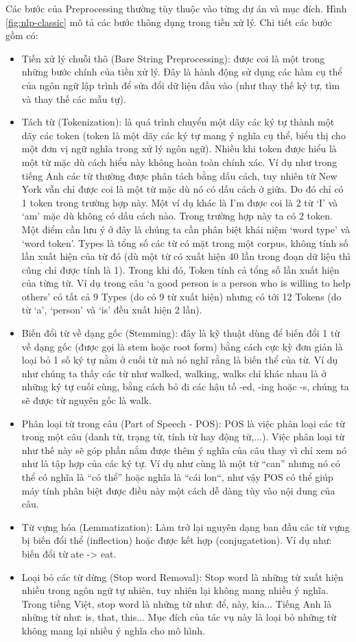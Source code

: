 Các bước của Preprocessing thường tùy thuộc vào từng dự án và mục đích. Hình \ref{fig:nlp-classic} mô tả các bước thông dụng trong tiền xử lý. Chi tiết các bước gồm có:
\begin{itemize}
    \item Tiền xử lý chuỗi thô (Bare String Preprocessing): được coi là một trong những bước chính của tiền xử lý. Đây là hành động sử dụng các hàm cụ thể của ngôn ngữ lập trình để sửa đổi dữ liệu đầu vào (như thay thế ký tự, tìm và thay thế các mẫu tự).
    \item Tách từ (Tokenization): là quá trình chuyển một dãy các ký tự thành một dãy các token (token là một dãy các ký tự mang ý nghĩa cụ thể, biểu thị cho một đơn vị ngữ nghĩa trong xử lý ngôn ngữ). Nhiều khi token được hiểu là một từ mặc dù cách hiểu này không hoàn toàn chính xác. Ví dụ như trong tiếng Anh các từ thường được phân tách bằng dấu cách, tuy nhiên từ New York vẫn chỉ được coi là một từ mặc dù nó có dấu cách ở giữa. Do đó chỉ có 1 token trong trường hợp này. Một ví dụ khác là I’m được coi là 2 từ ‘I’ và ‘am’ mặc dù không có dấu cách nào. Trong trường hợp này ta có 2 token. Một điểm cần lưu ý ở đây là chúng ta cần phân biệt khái niệm ‘word type’ và ‘word token’. Types là tổng số các từ có mặt trong một corpus, không tính số lần xuất hiện của từ đó (dù một từ có xuất hiện 40 lần trong đoạn dữ liệu thì cũng chỉ được tính là 1). Trong khi đó, Token tính cả tổng số lần xuất hiện của từng từ. Ví dụ trong câu ‘a good person is a person who is willing to help others’ có tất cả 9 Types (do có 9 từ xuất hiện) nhưng có tới 12 Tokens (do từ ‘a’, ‘person’ và ‘is’ đều xuất hiện 2 lần). 
    \item Biến đổi từ về dạng gốc (Stemming): đây là kỹ thuật dùng để biến đổi 1 từ về dạng gốc (được gọi là stem hoặc root form) bằng cách cực kỳ đơn giản là loại bỏ 1 số ký tự nằm ở cuối từ mà nó nghĩ rằng là biến thể của từ. Ví dụ như chúng ta thấy các từ như walked, walking, walks chỉ khác nhau là ở những ký tự cuối cùng, bằng cách bỏ đi các hậu tố -ed, -ing hoặc -s, chúng ta sẽ được từ nguyên gốc là walk.
    \item Phân loại từ trong câu (Part of Speech - POS): POS là việc phân loại các từ trong một câu (danh từ, trạng từ, tính từ hay động từ,...). Việc phân loại từ như thế này sẽ góp phần nắm được thêm ý nghĩa của câu thay vì chỉ xem nó như là tập hợp của các ký tự. Ví dụ như cùng là một từ “can” nhưng nó có thể có nghĩa là “có thể” hoặc nghĩa là “cái lon“, như vậy POS có thể giúp máy tính phân biệt được điều này một cách dễ dàng tùy vào nội dung của câu.
    \item Từ vựng hóa (Lemmatization): Làm trở lại nguyên dạng ban đầu các từ vựng bị biến đổi thể (inflection) hoặc được kết hợp (conjugatetion). Ví dụ như: biến đổi từ ate -> eat.
    \item Loại bỏ các từ dừng (Stop word Removal): Stop word là những từ xuất hiện nhiều trong ngôn ngữ tự nhiên, tuy nhiên lại không mang nhiều ý nghĩa. Trong tiếng Việt, stop word là những từ như: để, này, kia... Tiếng Anh là những từ như: is, that, this... Mục đích của tác vụ này là loại bỏ những từ không mang lại nhiều ý nghĩa cho mô hình.
\end{itemize}


